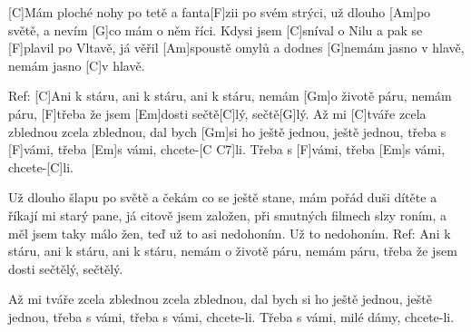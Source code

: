
[C]Mám ploché nohy po tetě a fanta[F]zii po svém strýci,
už dlouho [Am] po světě, a nevím [G]co mám o něm říci.
Kdysi jsem [C]sníval o Nilu a pak se [F]plavil po Vltavě,
já věřil [Am]spoustě omylů a dodnes [G]nemám jasno v hlavě, nemám jasno [C]v hlavě.

Ref: [C]Ani k stáru, ani k stáru, ani k stáru,
nemám [Gm]o životě páru, nemám páru,
[F]třeba že jsem [Em]dosti sečtě[C]lý, sečtě[G]lý.
Až mi [C]tváře zcela zblednou zcela zblednou,
dal bych [Gm]si ho ještě jednou, ještě jednou,
třeba s [F]vámi, třeba [Em]s vámi, chcete-[C C7]li.
Třeba s [F]vámi, třeba [Em]s vámi, chcete-[C]li.

Už dlouho šlapu po světě a čekám co se ještě stane,
mám pořád duši dítěte a říkají mi starý pane,
já citově jsem založen, při smutných filmech slzy roním,
a měl jsem taky málo žen, teď už to asi nedohoním. Už to nedohoním.
Ref: Ani k stáru, ani k stáru, ani k stáru,
nemám o životě páru, nemám páru,
třeba že jsem dosti sečtělý, sečtělý.

Až mi tváře zcela zblednou zcela zblednou,
dal bych si ho ještě jednou, ještě jednou,
třeba s vámi, třeba s vámi, chcete-li.
Třeba s vámi, milé dámy, chcete-li.
